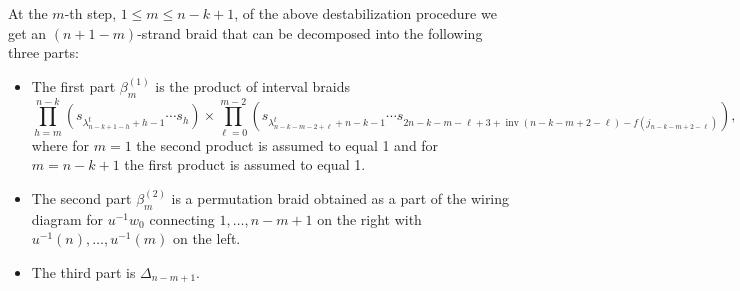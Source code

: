 \documentclass[10pt,a4paper]{amsart}
\DeclareMathOperator{\inv}{inv}
\begin{document}
\begin{lemma}
\label{lem: inductive destabilization}
At the $m$-th step, $1\le m\le n-k+1$, of the above destabilization procedure we get an $(n+1-m)$-strand braid  that can be decomposed into the following three parts:
\begin{itemize}
    \item[(a)] The first part $\beta^{(1)}_{m}$ is the product of interval braids
\[
\prod_{h = m}^{n-k}\left(s_{\lambda^{t}_{n-k+1-h}+h-1}\cdots s_h\right) \times
\prod_{\ell = 0}^{m-2}\left(s_{\lambda^{t}_{n-k-m-2+\ell}+n-k-1}\cdots s_{2n-k-m-\ell+3+\inv(n-k-m+2-\ell)-f(j_{n-k-m+2-\ell})}\right),
\]    
where for $m=1$ the second product is assumed to equal 1 and for $m = n-k+1$ the first product is assumed to equal 1.

\vspace{0.1cm}

\item[(b)] The second part $\beta^{(2)}_{m}$ is a permutation braid obtained as a part of the wiring diagram for $u^{-1}w_0$ connecting $1, \dots, n-m+1$ on the right with $u^{-1}(n),\ldots,u^{-1}(m)$ on the left.\\%

\item[(c)] The third part is $\Delta_{n-m+1}$.   \end{itemize}
\end{lemma}
\end{document}
